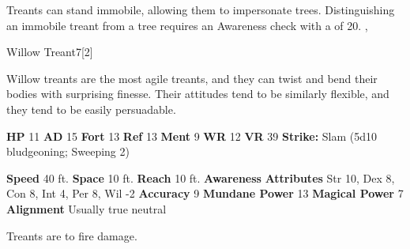         Treants can stand immobile, allowing them to impersonate trees.
        Distinguishing an immobile treant from a tree requires an Awareness check with a  of 20.
  ,
  \begin{monsubsection}{Willow Treant}{7}[2]
    \vspace{-1em}\vspace{-1em}
    \vspace{0em}

    
        Willow treants are the most agile treants, and they can twist and bend their bodies with surprising finesse.
        Their attitudes tend to be similarly flexible, and they tend to be easily persuadable.
      
    

    \begin{spellcontent}
      \begin{spelltargetinginfo}
        \pari \textbf{HP} 11 \monsep
          \textbf{AD} 15 \monsep
          \textbf{Fort} 13 \monsep
          \textbf{Ref} 13 \monsep
          \textbf{Ment} 9
        \pari \textbf{WR} 12 \monsep
        \textbf{VR} 39
        \pari \textbf{Strike:}
            Slam  (5d10 bludgeoning; Sweeping 2)
      \end{spelltargetinginfo}
    \end{spellcontent}
    \begin{monsterfooter}
      \pari \textbf{Speed} 40 ft. \monsep
        \textbf{Space} 10 ft. \monsep
        \textbf{Reach} 10 ft.
      \pari \textbf{Awareness} 
      \pari \textbf{Attributes}
        Str 10, Dex 8,
        Con 8, Int 4,
        Per 8, Wil -2
      \pari \textbf{Accuracy} 9 \monsep
        \textbf{Mundane Power} 13 \monsep
      \textbf{Magical Power} 7
      \pari \textbf{Alignment} Usually true neutral
    \end{monsterfooter}
  \end{monsubsection}
        Treants are  to fire damage.
      
